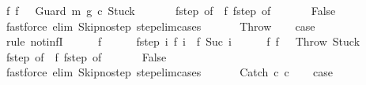 \begin{isabellebody}
\ f{\isacharunderscore}{}{\isacharcolon}\ {\isachardoublequoteopen}f\ {}\ {\isacharequal}\ {\isacharparenleft}Guard\ m\ g\ c{\isacharcomma}\ Stuck{\isacharparenright}{\isachardoublequoteclose}\ \isanewline
\ \ \ \ \isamarkupfalse%
\ f{\isacharunderscore}step\ {\isacharbrackleft}of\ {}{\isacharbrackright}\ f{\isacharunderscore}{}\ f{\isacharunderscore}step\ {\isacharbrackleft}of\ {}{\isacharbrackright}\isanewline
\ \ \ \ \isamarkupfalse%
\ False\isanewline
\ \ \ \ \ \ \isamarkupfalse%
\ {\isacharparenleft}fastforce\ elim{\isacharcolon}\ Skip{\isacharunderscore}no{\isacharunderscore}step\ step{\isacharunderscore}elim{\isacharunderscore}cases{\isacharparenright}\isanewline
\ \ \isamarkupfalse%
\isanewline
{}\isamarkupfalse%
\isanewline
\ \ \isamarkupfalse%
\ Throw\isanewline
\ \ \isamarkupfalse%
\ {\isacharquery}case\ \isanewline
\ \ \isamarkupfalse%
\ {\isacharparenleft}rule\ not{\isacharunderscore}infI{\isacharparenright}\isanewline
\ \ \ \ \isamarkupfalse%
\ f\isanewline
\ \ \ \ \isamarkupfalse%
\ f{\isacharunderscore}step{\isacharcolon}\ {\isachardoublequoteopen}{\isasymAnd}i{\isachardot}\ {\isasymGamma}{\isasymturnstile}f\ i\ {\isasymrightarrow}\ f\ {\isacharparenleft}Suc\ i{\isacharparenright}{\isachardoublequoteclose}\isanewline
\ \ \ \ \isamarkupfalse%
\ f{\isacharunderscore}{}{\isacharcolon}\ {\isachardoublequoteopen}f\ {}\ {\isacharequal}\ {\isacharparenleft}Throw{\isacharcomma}\ Stuck{\isacharparenright}{\isachardoublequoteclose}\ \isanewline
\ \ \ \ \isamarkupfalse%
\ f{\isacharunderscore}step\ {\isacharbrackleft}of\ {}{\isacharbrackright}\ f{\isacharunderscore}{}\ f{\isacharunderscore}step\ {\isacharbrackleft}of\ {}{\isacharbrackright}\isanewline
\ \ \ \ \isamarkupfalse%
\ False\isanewline
\ \ \ \ \ \ \isamarkupfalse%
\ {\isacharparenleft}fastforce\ elim{\isacharcolon}\ Skip{\isacharunderscore}no{\isacharunderscore}step\ step{\isacharunderscore}elim{\isacharunderscore}cases{\isacharparenright}\isanewline
\ \ \isamarkupfalse%
\isanewline
{}\isamarkupfalse%
\isanewline
\ \ \isamarkupfalse%
\ {\isacharparenleft}Catch\ c\ c\isanewline
\ \ \isamarkupfalse%
\ {\isacharquery}case\isanewline

\end{isabellebody}
